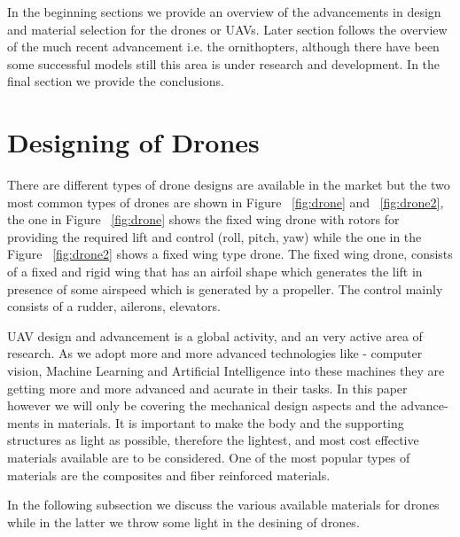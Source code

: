 \documentclass{article}
\begin{document}
In the beginning sections we provide an overview of the advancements in design and material selection for the drones or UAVs. Later section follows the overview of the much recent advancement i.e. the ornithopters, although there have been some successful models still this area is under research and development. In the final section we provide the conclusions.

\section{Designing of Drones}
There are different types of drone designs are available in the market but the two most common types of drones are shown in Figure ~\ref{fig:drone} and ~\ref{fig:drone2}, the one in Figure ~\ref{fig:drone} shows the fixed wing drone with rotors for providing the required lift and control (roll, pitch, yaw) while the one in the Figure ~\ref{fig:drone2} shows a fixed wing type drone. The fixed wing drone, consists of a fixed and rigid wing that has an airfoil shape which generates the  lift in presence of some airspeed which is generated by a propeller. The control mainly consists of a rudder, ailerons, elevators. 

UAV design and advancement is a global activity, and an very active area of research.  As we adopt more and more advanced technologies like - computer vision, Machine Learning and Artificial Intelligence into these machines they are getting more and more advanced and acurate in their tasks. In this paper however we will only be covering the mechanical design aspects and the advance-ments in materials. It is important to make the body and the supporting structures as light as possible, therefore the lightest, and most cost effective materials available are to be considered. One of the most popular types of materials are the composites and fiber reinforced materials. 

In the following subsection we discuss the various available materials for drones while in the latter we throw some light in the desining of drones.
\end{document}
